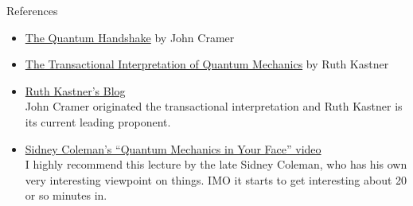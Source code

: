 \documentclass[9pt,usenames,dvipsnames]{beamer}
\begin{document}
\begin{frame}[t]{References}
\vspace{0pt}
\begin{itemize}
\item \href{https://www.goodreads.com/book/show/26362020-the-quantum-handshake?ac=1&from_search=true&qid=Tta3kWOxqK&rank=1}{The Quantum Handshake} by John Cramer\\
\item \href{https://www.goodreads.com/book/show/24509073-the-transactional-interpretation-of-quantum-mechanics?ac=1&from_search=true&qid=CrasunyOEg&rank=1}{The Transactional Interpretation of Quantum Mechanics} by Ruth Kastner\\
\item \href{https://transactionalinterpretation.org/}{Ruth Kastner's Blog}
\vspace{0pt}\\
    John Cramer originated the transactional interpretation and Ruth Kastner is its current leading proponent. 
\item \href{http://media.physics.harvard.edu/video/?id=SidneyColeman_QMIYF}{Sidney Coleman’s “Quantum Mechanics in Your Face” video}\\
    I highly recommend this lecture by the late Sidney Coleman, who has his own very interesting viewpoint on things. IMO it starts to get interesting about 20 or so minutes in.

\end{itemize}
\end{frame}
\end{document}
